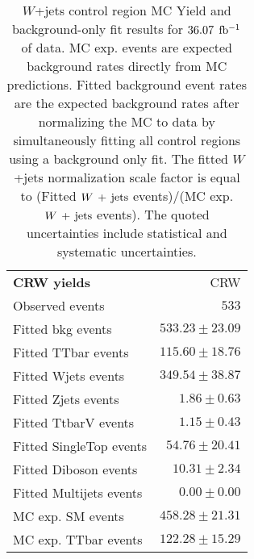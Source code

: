 

\begin{table}[h!]
\caption[$W$+jets control region MC Yield and background-only fit results for $\intlumi$ $\ifb$ of data]{$W$+jets control region MC Yield and background-only fit results for $\intlumi$ $\ifb$ of data. MC exp. events are expected background rates directly from MC predictions.  Fitted background event rates are the expected background rates after normalizing the MC to data by simultaneously fitting all control regions using a background only fit.  The fitted $W$+jets normalization scale factor is equal to (Fitted $W\,+\,\mathrm{jets}$ events)/(MC exp. $W\,+\,\mathrm{jets}$ events). The quoted uncertainties include statistical and systematic uncertainties. }
\label{table.bkgonly.CRW}
\begin{center}
\setlength{\tabcolsep}{0.0pc}
{\small
\begin{tabular*}{\textwidth}{@{\extracolsep{\fill}}lr}
\noalign{\smallskip}\hline\noalign{\smallskip}
{\bf CRW yields}           & CRW                      \\[-0.05cm]
\noalign{\smallskip}\hline\noalign{\smallskip}
Observed events          & $533$                       \\
\noalign{\smallskip}\hline\noalign{\smallskip}
Fitted bkg events         & $533.23 \pm 23.09$                 \\
\noalign{\smallskip}\hline\noalign{\smallskip}
        Fitted TTbar events         & $115.60 \pm 18.76$                     \\
        Fitted Wjets events         & $349.54 \pm 38.87$                  \\
        Fitted Zjets events         & $1.86 \pm 0.63$                   \\
        Fitted TtbarV events         & $1.15 \pm 0.43$                     \\
        Fitted SingleTop events         & $54.76 \pm 20.41$                     \\
        Fitted Diboson events         & $10.31 \pm 2.34$                    \\
        Fitted Multijets events         & $0.00 \pm 0.00$                 \\
 \noalign{\smallskip}\hline\noalign{\smallskip}
MC exp. SM events              & $458.28 \pm 21.31$                     \\
\noalign{\smallskip}\hline\noalign{\smallskip}
        MC exp. TTbar events         & $122.28 \pm 15.29$                   \\

\end{tabular*}}
\end{center}
\end{table}
